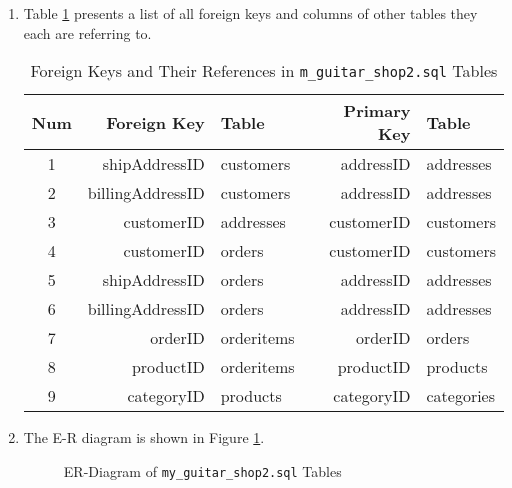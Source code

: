 \begin{enumerate}[label=(\alph*)]
\item Table \ref{tab21} presents a list of all foreign keys and columns of other tables they each are referring to.

\begin{table}\centering
\begin{tabular}{ c | r | l | r | l }
Num & Foreign Key & Table & Primary Key & Table\\
\hline
1 & shipAddressID & customers & addressID & addresses\\
2 & billingAddressID & customers & addressID & addresses\\
3 & customerID & addresses & customerID & customers\\
4 & customerID & orders & customerID & customers\\
5 & shipAddressID & orders & addressID & addresses\\
6 & billingAddressID & orders & addressID & addresses\\
7 & orderID & orderitems & orderID & orders\\
8 & productID & orderitems & productID & products\\
9 & categoryID & products & categoryID & categories\\
\end{tabular}
\caption{Foreign Keys and Their References in \texttt{m\_guitar\_shop2.sql} Tables}\label{tab21}
\end{table}

\item The E-R diagram is shown in Figure \ref{fig22}.

\begin{figure}\centering

\caption{ER-Diagram of \texttt{my\_guitar\_shop2.sql} Tables}\label{fig22}
\end{figure}

\end{enumerate}
